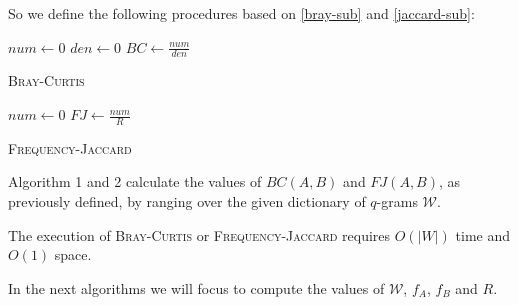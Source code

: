 So we define the following procedures based on \eqref{bray-sub} and \eqref{jaccard-sub}:\\

\begin{algorithm}[h]
	\small
	\DontPrintSemicolon
	\BlankLine
	$num \gets 0$\;
	$den \gets 0$\;
	$BC \gets \frac{num}{den}$\;
	\caption{\textsc{Bray-Curtis}}
	\label{alg:bray-curtis}
\end{algorithm}

\begin{algorithm}[h]
	\small
	\DontPrintSemicolon
	\BlankLine
	$num \gets 0$\;
	$FJ \gets \frac{num}{R}$\;
	\caption{\textsc{Frequency-Jaccard}}
	\label{alg:jaccard}
\end{algorithm}

Algorithm 1 and 2 calculate the values of $BC(A,B)$ and $FJ(A,B)$, as previously defined, by ranging over the given dictionary of $q$-grams $\mathcal{W}$.

\begin{lemma}
	The execution of \textsc{Bray-Curtis} or \textsc{Frequency-Jaccard} requires $O(|W|)$ time and $O(1)$ space. 	
\end{lemma}

In the next algorithms we will focus to compute the values of $\mathcal{W}$, $f_{A}$, $f_{B}$ and $R$.

\clearpage 
